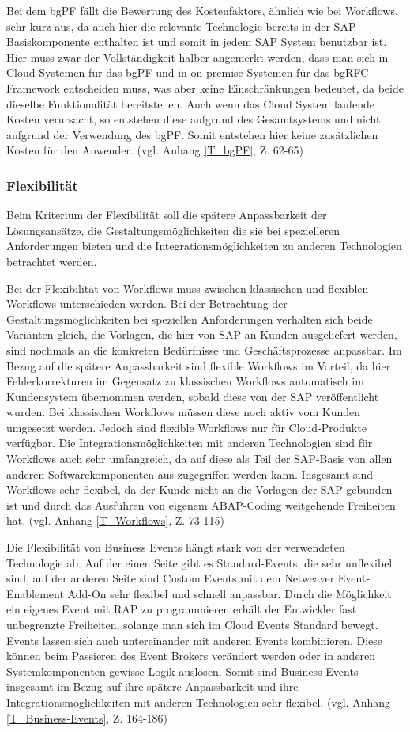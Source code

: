 Bei dem bgPF fällt die Bewertung des Kostenfaktors, ähnlich wie bei Workflows, sehr kurz aus, da auch hier die relevante Technologie bereits in der SAP Basiskomponente enthalten ist und somit in jedem SAP System benutzbar ist. Hier muss zwar der Vollständigkeit halber angemerkt werden, dass man sich in Cloud Systemen für das bgPF und in on-premise Systemen für das bgRFC Framework entscheiden muss, was aber keine Einschränkungen bedeutet, da beide dieselbe Funktionalität bereitstellen. Auch wenn das Cloud System laufende Kosten verursacht, so entstehen diese aufgrund des Gesamtsystems und nicht aufgrund der Verwendung des bgPF. Somit entstehen hier keine zusätzlichen Kosten für den Anwender. (vgl. Anhang \ref{T_bgPF}, Z. 62-65)

\subsubsection{Flexibilität}

Beim Kriterium der Flexibilität soll die spätere Anpassbarkeit der Lösungsansätze, die Gestaltungsmöglichkeiten die sie bei spezielleren Anforderungen bieten und die Integrationsmöglichkeiten zu anderen Technologien betrachtet werden.

Bei der Flexibilität von Workflows muss zwischen klassischen und flexiblen Workflows unterschieden werden. Bei der Betrachtung der Gestaltungsmöglichkeiten bei speziellen Anforderungen verhalten sich beide Varianten gleich, die Vorlagen, die hier von SAP an Kunden ausgeliefert werden, sind nochmals an die konkreten Bedürfnisse und Geschäftsprozesse anpassbar. Im Bezug auf die spätere Anpassbarkeit sind flexible Workflows im Vorteil, da hier Fehlerkorrekturen im Gegensatz zu klassischen Workflows automatisch im Kundensystem übernommen werden, sobald diese von der SAP veröffentlicht wurden. Bei klassischen Workflows müssen diese noch aktiv vom Kunden umgesetzt werden. Jedoch sind flexible Workflows nur für Cloud-Produkte verfügbar. Die Integrationsmöglichkeiten mit anderen Technologien sind für Workflows auch sehr umfangreich, da auf diese als Teil der SAP-Basis von allen anderen Softwarekomponenten aus zugegriffen werden kann. Insgesamt sind Workflows sehr flexibel, da der Kunde nicht an die Vorlagen der SAP gebunden ist und durch das Ausführen von eigenem ABAP-Coding weitgehende Freiheiten hat. (vgl. Anhang \ref{T_Workflows}, Z. 73-115)

Die Flexibilität von Business Events hängt stark von der verwendeten Technologie ab. Auf der einen Seite gibt es Standard-Events, die sehr unflexibel sind, auf der anderen Seite sind Custom Events mit dem Netweaver Event-Enablement Add-On sehr flexibel und schnell anpassbar. Durch die Möglichkeit ein eigenes Event mit RAP zu programmieren erhält der Entwickler fast unbegrenzte Freiheiten, solange man sich im Cloud Events Standard bewegt. Events lassen sich auch untereinander mit anderen Events kombinieren. Diese können \zB beim Passieren des Event Brokers verändert werden oder in anderen Systemkomponenten gewisse Logik auslösen. Somit sind Business Events insgesamt im Bezug auf ihre spätere Anpassbarkeit und ihre Integrationsmöglichkeiten mit anderen Technologien sehr flexibel. (vgl. Anhang \ref{T_Business-Events}, Z. 164-186)

